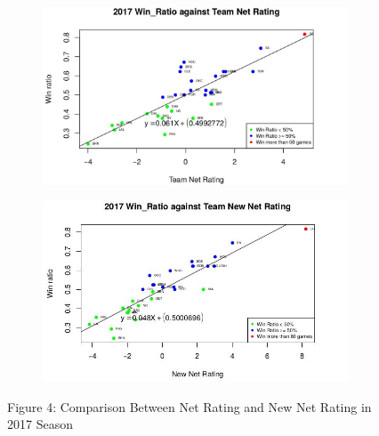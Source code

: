 \documentclass[11pt]{article}
\begin{document}
\begin{figure}[h!]
  \centering
  \begin{subfigure}[b]{0.45\linewidth}
    \includegraphics[width=\linewidth]{nr_17.jpg}
  \end{subfigure}
  \begin{subfigure}[b]{0.45\linewidth}
    \includegraphics[width=\linewidth]{new_nr_17.jpg}
  \end{subfigure}

\bigskip

Figure 4: Comparison Between Net Rating and New Net Rating in 2017 Season
\end{figure}

\newpage
\end{document}
